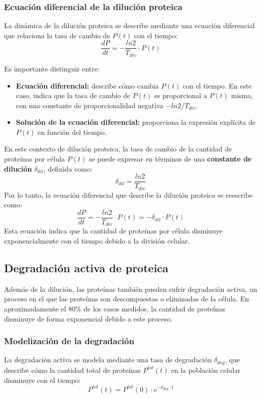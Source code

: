 \subsubsection{Ecuación diferencial de la dilución proteica}
La dinámica de la dilución proteica se describe mediante una ecuación diferencial que relaciona la tasa de cambio de $P(t)$ con el tiempo:
$$\frac{dP}{dt} = -\frac{ln 2}{T_{div}} \cdot P(t)$$

Es importante distinguir entre:
\begin{itemize}
\item \textbf{Ecuación diferencial:} describe cómo cambia $P(t)$ con el tiempo. En este caso, indica que la tasa de cambio de $P(t)$ es proporcional a $P(t)$ misma, con una constante de proporcionalidad negativa $- ln 2/T_{div}$.
\item \textbf{Solución de la ecuación diferencial:} proporciona la expresión explícita de $P(t)$ en función del tiempo.
\end{itemize}

En este contexto de dilución proteica, la tasa de cambio de la cantidad de proteínas por célula $P(t)$ se puede expresar en términos de una \textbf{constante de dilución} $\delta_{dil}$, definida como:
$$ \delta_{dil} = \frac{ln 2}{T_{div}}$$
Por lo tanto, la ecuación diferencial que describe la dilución proteica se reescribe como:
$$\frac{dP}{dt} = -\frac{ln 2}{T_{div}} \cdot P(t) = -\delta_{dil} \cdot P(t)$$
Esta ecuación indica que la cantidad de proteínas por célula disminuye exponencialmente con el tiempo debido a la división celular.

\subsection{Degradación activa de proteica}
Además de la dilución, las proteínas también pueden sufrir degradación activa, un proceso en el que las proteínas son descompuestas o eliminadas de la célula. En aproximadamente el 80\% de los casos medidos, la cantidad de proteínas disminuye de forma exponencial debido a este proceso.

\subsubsection{Modelización de la degradación}
La degradación activa se modela mediante una tasa de degradación $\delta_{deg}$, que describe cómo la cantidad total de proteínas $P^{tot}(t)$ en la población celular disminuye con el tiempo:
$$P^{tot}(t) = P^{tot}(0) \cdot e^{-\delta_{deg}\cdot t}$$

